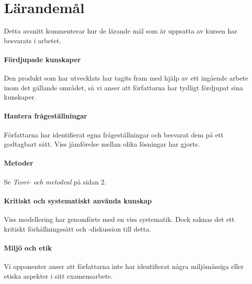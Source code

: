 \section{Lärandemål} %
\label{sec:l_randem_l}
    Detta avsnitt kommenterar hur de lärande mål som är uppsatta av kursen har besvarats i arbetet.

    \paragraph{Fördjupade kunskaper}
        Den produkt som har utvecklats har tagits fram med hjälp av ett ingående arbete inom det gällande området, så vi anser att författarna har tydligt fördjupat sina kunskaper.

    \paragraph{Hantera frågeställningar}
        Författarna har identifierat egna frågeställningar och besvarat dem på ett godtagbart sätt. Viss jämförelse mellan olika lösningar har gjorts.

    \paragraph{Metoder}
        Se \emph{Teori- och metodval} på sidan 2.

    \paragraph{Kritiskt och systematiskt använda kunskap}
        Viss modellering har genomförts med en viss systematik. Dock saknas det ett kritiskt förhållningssätt och -diskussion till detta.

    \paragraph{Miljö och etik}
        Vi opponenter anser att författarna inte har identifierat några  miljömässiga eller etiska aspekter i sitt examensarbete.

